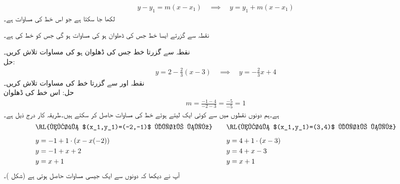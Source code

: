 \begin{align*}
y-y_1=m(x-x_1)\quad \implies \quad y=y_1+m(x-x_1)
\end{align*}
لکھا جا سکتا ہے جو اس خط کی مساوات ہے۔

نقطہ  سے گزرتے ایسا خط جس کی ڈھلوان  ہو کی مساوات  ہو گی جس کو  خط کی  ہے۔

نقطہ  سے گزرتا خط جس کی ڈھلوان   ہو کی مساوات تلاش کریں۔\\
حل:\quad
\begin{align*}
y=2-\frac{2}{3}(x-3)\quad \implies \quad y=-\frac{2}{3}x+4
\end{align*}
نقطہ  اور  سے گزرتا خط کی مساوات تلاش کریں۔\\
حل:\quad
اس خط کی ڈھلوان
\begin{align*}
m=\frac{-1-4}{-2-3}=\frac{-5}{-5}=1
\end{align*}
ہے۔ہم دونوں نقطوں میں سے کوئی ایک لیتے ہوئے خط کی مساوات حاصل کر سکتے ہیں۔طریقہ کار درج ذیل ہے۔
\begin{gather*}
\begin{aligned}
&\text{\RL{نقطہ $(x_1,y_1)=(-2,-1)$ لیتے ہیں}}\\[0.5em]
&y=-1+1\cdot(x-x(-2))\\
&y=-1+x+2\\
&y=x+1
\end{aligned}\quad\quad
\begin{aligned}
&\text{\RL{نقطہ $(x_1,y_1)=(3,4)$ لیتے ہیں}}\\[0.5em]
&y=4+1\cdot(x-3)\\
&y=4+x-3\\
&y=x+1
\end{aligned}
\end{gather*}
آپ نے دیکھا کہ دونوں سے ایک جیسی مساوات حاصل ہوتی ہے (شکل )۔
